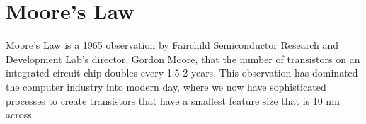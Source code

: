 \section{Moore's Law}


Moore's Law is a 1965 observation by Fairchild Semiconductor Research and Development Lab's director, Gordon Moore, that the number of transistors on an integrated circuit chip doubles every 1.5-2 years. This observation has dominated the computer industry into modern day, where we now have sophisticated processes to create transistors that have a smallest feature size that is 10 \si{\nano\meter} across.

